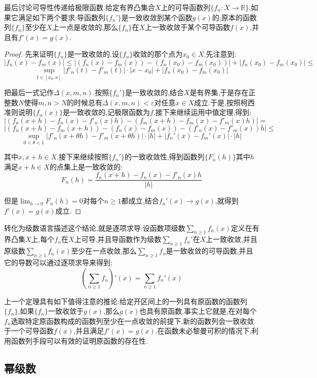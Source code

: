 最后讨论可导性传递给极限函数.给定有界凸集合$X$上的可导函数列$\{f_n:X\to\mathbb{R}\}$,如果它满足如下两个要求:导函数列$\{f_n'\}$是一致收敛到某个函数$g(x)$的;原本的函数列$\{f_n\}$至少在$X$上一点是收敛的,那么$\{f_n\}$在$X$上一致收敛于某个可导函数$f(x)$,并且有$f'(x)=g(x)$.
\begin{proof}
	
	先来证明$\{f_n\}$是一致收敛的.设$\{f_n\}$收敛的那个点为$x_0\in X$.先注意到:
	$$|f_n(x)-f_m(x)|\le|(f_n(x)-f_m(x))- (f_n(x_0)-f_m(x_0))|+|f_n(x_0)-f_m(x_0)|\le$$
	$$\sup_{t\in[x_0,x]}|f'_n(t)-f'_m(t)|\cdot|x-x_0|+|f_n(x_0)-f_m(x_0)|$$
	
	把最后一式记作$\Delta(x,m,n)$.按照$\{f_n'\}$是一致收敛的,结合$X$是有界集,于是存在正整数$N$使得$m,n>N$的时候总有$\Delta(x,m,n)<\varepsilon$对任意$x\in X$成立.于是,按照柯西准则说明$\{f_n(x)\}$是一致收敛的,记极限函数为$f$.接下来继续运用中值定理,得到:
	$$\left|\left(f_n(x+h)-f_n(x)-f'_n(x)h\right)-\left(f_m(x+h)-f_m(x)-f'_m(x)h\right)\right|=$$
	$$\left|(f_n(x+h)-f_m(x+h))-(f_n(x)-f_m(x))-(f'_n(x)-f'_m(x))h\right|\le$$
	$$\sup_{0<\theta<1}\left|f'_n(x+\theta h)-f'_m(x+\theta h)\right|\cdot|h|+\left|f_n'(x)-f_m'(x)\right|\cdot|h|$$
	
	其中$x,x+h\in X$.接下来继续按照$\{f_n'\}$的一致收敛性,得到函数列$\{F_n(h)\}$其中$h$满足$x+h\in X$的点集上是一致收敛的:
	$$F_n(h)=\frac{f_n(x+h)-f_n(x)-f'_n(x)h}{|h|}$$
	
	但是$\lim_{h\to0}F_n(h)=0$对每个$n\ge1$都成立,结合$f_n'(x)\to g(x)$,就得到$f'(x)=g(x)$成立.
	
\end{proof}

转化为级数语言描述这个结论,就是逐项求导:设函数项级数$\sum_{n\ge1}f_n(x)$定义在有界凸集$X$上,每个$f_n$在$X$上可导,并且导函数作为级数$\sum_{n\ge1}f_n'$在$X$上一致收敛,并且原级数$\sum_{n\ge1}f_n(x)$至少在一点收敛,那么$\sum_{n\ge1}f_n$是一致收敛的可导函数,并且它的导数可以通过逐项求导来得到:
$$\left(\sum_{n\ge1}f_n\right)'(x)=\sum_{n\ge1}f_n'(x)$$

上一个定理具有如下值得注意的推论:给定开区间上的一列具有原函数的函数列$\{f_n\}$,如果$\{f_n\}$一致收敛于$g(x)$,那么$g(x)$也具有原函数.事实上它就是,在对每个$f_n$选取特定原函数构成的函数列至少在一点收敛的前提下,新的函数列会一致收敛于一个可导函数$f(x)$,并且满足$f'(x)=g(x)$.在函数未必黎曼可积的情况下,利用函数列手段可以有效的证明原函数的存在性.
\newpage
\subsection{幂级数}

